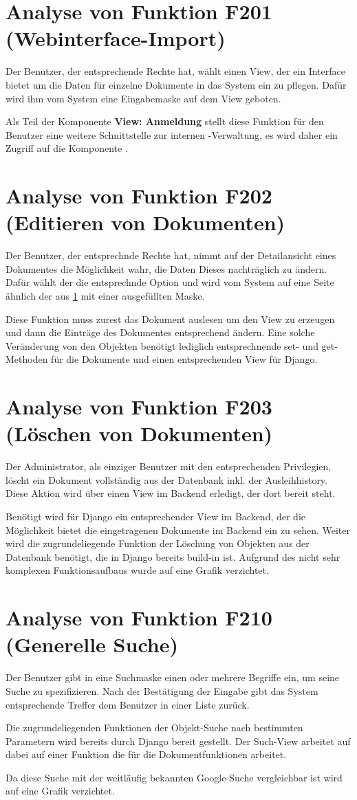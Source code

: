 \section{Analyse von Funktion F201 (Webinterface-Import)}
\label{f:201}
Der Benutzer, der entsprechende Rechte hat, wählt einen View, der ein Interface
bietet um die Daten für einzelne Dokumente in das System ein zu pflegen. Dafür
wird ihm vom System eine Eingabemaske auf dem View geboten.

Als Teil der Komponente \textbf{View: Anmeldung} stellt diese Funktion für den
Benutzer eine weitere Schnittstelle zur internen \BibTeX -Verwaltung, es wird
daher ein Zugriff auf die Komponente \textbf{}.%

\section{Analyse von Funktion F202 (Editieren von Dokumenten)}
Der Benutzer, der entsprechnde Rechte hat, nimmt auf der Detailansicht eines
Dokumentes die Möglichkeit wahr, die Daten Dieses nachträglich zu ändern. Dafür
wählt der die entsprechnde Option und wird vom System auf eine Seite ähnlich der
aus \ref{f:201} mit einer ausgefüllten Maske.

Diese Funktion muss zurest das Dokument auslesen um den View zu erzeugen und
dann die Einträge des Dokumentes entsprechend ändern. Eine solche Veränderung
von den Objekten benötigt lediglich entsprechnende set- und get-Methoden für die
Dokumente und einen entsprechenden View für Django.

\section{Analyse von Funktion F203 (Löschen von Dokumenten)}
Der Administrator, als einziger Benutzer mit den entsprechenden Privilegien,
löscht ein Dokument vollständig aus der Datenbank inkl. der Ausleihhistory.
Diese Aktion wird über einen View im Backend erledigt, der dort bereit steht.

Benötigt wird für Django ein entsprechender View im Backend, der die Möglichkeit
bietet die eingetragenen Dokumente im Backend ein zu sehen. Weiter wird die
zugrundeliegende Funktion der Löschung von Objekten aus der Datenbank benötigt,
die in Django bereits build-in ist. Aufgrund des nicht sehr komplexen
Funktionsaufbaus wurde auf eine Grafik verzichtet.

\section{Analyse von Funktion F210 (Generelle Suche)}
Der Benutzer gibt in eine Suchmaske einen oder mehrere Begriffe ein, um seine
Suche zu spezifizieren. Nach der Bestätigung der Eingabe gibt das System
entsprechende Treffer dem Benutzer in einer Liste zurück.

Die zugrundeliegenden Funktionen der Objekt-Suche nach bestimmten Parametern
wird bereits durch Django bereit gestellt. Der Such-View arbeitet auf dabei auf
einer Funktion die für die Dokumentfunktionen arbeitet.

Da diese Suche mit der weitläufig bekannten Google-Suche vergleichbar ist wird
auf eine Grafik verzichtet.
